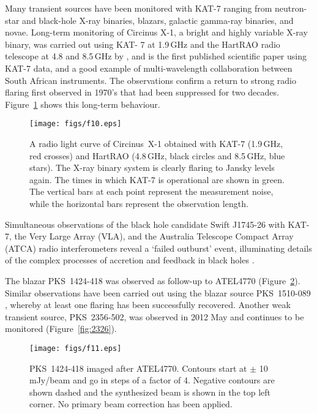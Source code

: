 \noindent

Many transient sources 
have been monitored with KAT-7 ranging from neutron-star 
and black-hole X-ray binaries, blazars, galactic 
gamma-ray binaries, and novae.
Long-term monitoring of Circinus X-1, a bright and highly variable
X-ray binary, was carried out using KAT- 7 at 1.9\,GHz and the HartRAO
radio telescope at 4.8 and 8.5\,GHz by \citealt{armstrong}, and is
the first published scientific paper using KAT-7 data, and a good
example of multi-wavelength collaboration between South African
instruments. The observations confirm a return to strong radio flaring
first observed in 1970's that had been suppressed for two
decades. Figure~\ref{fig:2F_OBS} shows this long-term behaviour.

\begin{figure}
\texttt{[image: figs/f10.eps]}
\caption{A radio light curve of Circinus~X-1 obtained with KAT-7 (1.9\,GHz,
red crosses) and HartRAO (4.8\,GHz, black circles and 8.5\,GHz, blue stars). 
The X-ray binary system is clearly flaring to Jansky levels again. The times in 
which KAT-7 is operational are shown in green. The vertical bars at each
point represent the measurement noise, while the horizontal bars represent
the observation length.}
\label{fig:2F_OBS}
\end{figure}

Simultaneous observations of the black hole candidate Swift
\mbox{J1745-26} with KAT-7, the Very Large Array (VLA), and the Australia
Telescope Compact Array (ATCA) radio interferometers reveal a `failed outburst'
event, illuminating details of the complex processes of accretion and
feedback in black holes \citep{curran}.

The blazar \mbox{PKS 1424-418} was observed as follow-up to ATEL4770
(Figure~\ref{fig:atel4770}).  Similar observations have been carried
out using the blazar source \mbox{PKS 1510-089} \citep{oozeer},
whereby at least one flaring has been successfully recovered. Another
weak transient source, \mbox{PKS 2356-502}, was observed in 2012 May
and continues to be monitored (Figure~\ref{fig:2326}).

\begin{figure}
\texttt{[image: figs/f11.eps]}
\caption{\mbox{PKS 1424-418} imaged after ATEL4770. Contours start at $\pm$
  10\,mJy/beam and go in steps of a factor of 4. Negative contours are
  shown dashed and the synthesized beam is shown in the top left
  corner. No primary beam correction has been applied.}
\label{fig:atel4770}
\end{figure}

